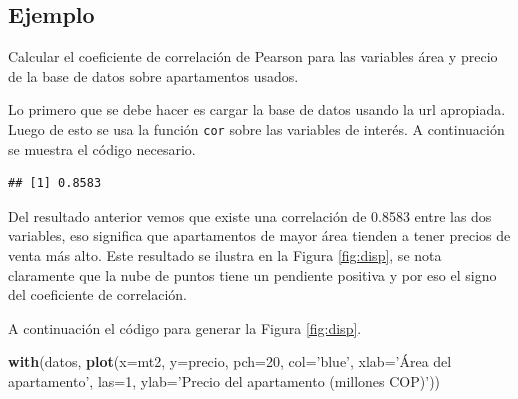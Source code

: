 \documentclass[10pt,]{krantz}
\makeatletter
\newenvironment{Shaded}{\begin{snugshade}}{\end{snugshade}}
\newcommand{\KeywordTok}[1]{\textcolor[rgb]{0.13,0.29,0.53}{\textbf{{#1}}}}
\newcommand{\DataTypeTok}[1]{\textcolor[rgb]{0.13,0.29,0.53}{{#1}}}
\newcommand{\DecValTok}[1]{\textcolor[rgb]{0.00,0.00,0.81}{{#1}}}
\newcommand{\StringTok}[1]{\textcolor[rgb]{0.31,0.60,0.02}{{#1}}}
\newcommand{\NormalTok}[1]{{#1}}
\newenvironment{kframe}{%
\medskip{}
\setlength{\fboxsep}{.8em}
 \def\at@end@of@kframe{}%
 \ifinner\ifhmode%
  \def\at@end@of@kframe{\end{minipage}}%
  \begin{minipage}{\columnwidth}%
 \fi\fi%
 \def\FrameCommand##1{\hskip\@totalleftmargin \hskip-\fboxsep
 \colorbox{shadecolor}{##1}\hskip-\fboxsep
     \hskip-\linewidth \hskip-\@totalleftmargin \hskip\columnwidth}%
 \MakeFramed {\advance\hsize-\width
   \@totalleftmargin\z@ \linewidth\hsize
   \@setminipage}}%
 {\par\unskip\endMakeFramed%
 \at@end@of@kframe}
\renewenvironment{Shaded}{\begin{kframe}}{\end{kframe}}
\makeatother
\begin{document}
\subsection*{Ejemplo}\label{ejemplo-43}


Calcular el coeficiente de correlación de Pearson para las variables
área y precio de la base de datos sobre apartamentos usados.

Lo primero que se debe hacer es cargar la base de datos usando la url
apropiada. Luego de esto se usa la función \texttt{cor} sobre las
variables de interés. A continuación se muestra el código necesario.

\begin{Shaded}
\end{Shaded}

\begin{verbatim}
## [1] 0.8583
\end{verbatim}

Del resultado anterior vemos que existe una correlación de 0.8583 entre
las dos variables, eso significa que apartamentos de mayor área tienden
a tener precios de venta más alto. Este resultado se ilustra en la
Figura \ref{fig:disp}, se nota claramente que la nube de puntos tiene un
pendiente positiva y por eso el signo del coeficiente de correlación.

A continuación el código para generar la Figura \ref{fig:disp}.

\begin{Shaded}
\begin{Highlighting}[]
\KeywordTok{with}\NormalTok{(datos, }\KeywordTok{plot}\NormalTok{(}\DataTypeTok{x=}\NormalTok{mt2, }\DataTypeTok{y=}\NormalTok{precio, }\DataTypeTok{pch=}\DecValTok{20}\NormalTok{, }\DataTypeTok{col=}\StringTok{'blue'}\NormalTok{,}
                 \DataTypeTok{xlab=}\StringTok{'Área del apartamento'}\NormalTok{, }\DataTypeTok{las=}\DecValTok{1}\NormalTok{,}
                 \DataTypeTok{ylab=}\StringTok{'Precio del apartamento (millones COP)'}\NormalTok{))}
\end{Highlighting}
\end{Shaded}
\end{document}
